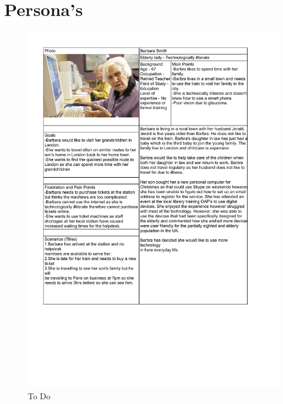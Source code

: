 \section{Persona's}
\begin{figure}[h!]
	\centering
	\includegraphics[scale=.8, angle=0, origin=c]{images/personaBarbara}
	\caption{To Do}
	\label{fig:barbara}
\end{figure}

\newpage

